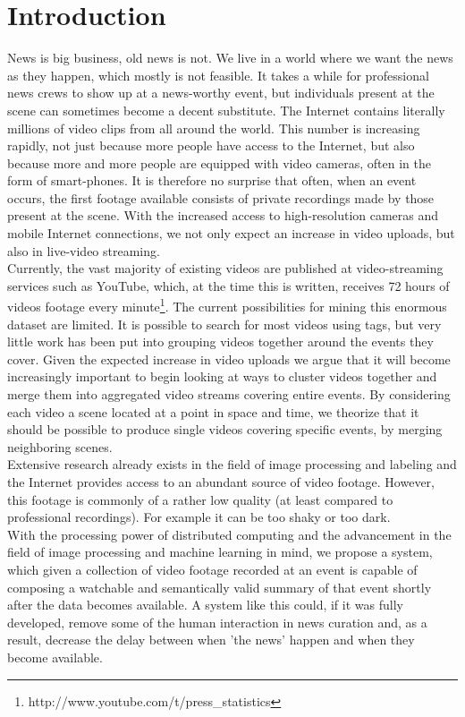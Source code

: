 %
\chapter{Introduction}
%
News is big business, old news is not. We live in a world where we want the news as they happen, which mostly is not feasible. It takes a while for professional news crews to show up at a news-worthy event, but individuals present at the scene can sometimes become a decent substitute. The Internet contains literally millions of video clips from all around the world. This number is increasing rapidly, not just because more people have access to the Internet, but also because more and more people are equipped with video cameras, often in the form of smart-phones. It is therefore no surprise that often, when an event occurs, the first footage available consists of private recordings made by those present at the scene. With the increased access to high-resolution cameras and mobile Internet connections, we not only expect an increase in video uploads, but also in live-video streaming.\\
Currently, the vast majority of existing videos are published at video-streaming services such as YouTube, which, at the time this is written, receives 72 hours of videos footage every minute\footnote{http://www.youtube.com/t/press\_statistics}. The current possibilities for mining this enormous dataset are limited. It is possible to search for most videos using tags, but very little work has been put into grouping videos together around the events they cover. Given the expected increase in video uploads we argue that it will become increasingly important to begin looking at ways to cluster videos together and merge them into aggregated video streams covering entire events. By considering each video a scene located at a point in space and time, we theorize that it should be possible to produce single videos covering specific events, by merging neighboring scenes.\\
Extensive research already exists in the field of image processing and labeling and the Internet provides access to an abundant source of video footage. However, this footage is commonly of a rather low quality (at least compared to professional recordings). For example it can be too shaky or too dark.\\
With the processing power of distributed computing and the advancement in the field of image processing and machine learning in mind, we propose a system, which given a collection of video footage recorded at an event is capable of composing a watchable and semantically valid summary of that event shortly after the data becomes available. A system like this could, if it was fully developed, remove some of the human interaction in news curation and, as a result, decrease the delay between when 'the news' happen and when they become available.
%
